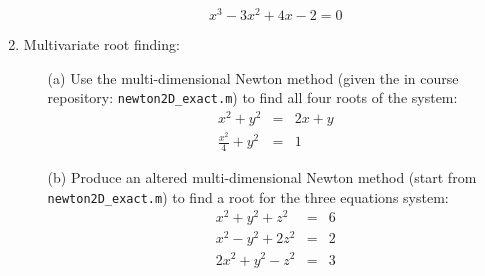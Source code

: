 \documentclass{article}
\begin{document}
\begin{enumerate}
\begin{itemize}
    \begin{equation}
      x^3-3x^2+4x-2=0
    \end{equation}  
  \end{itemize}
  \item Multivariate root finding:
  \begin{itemize}
    \item[(a)]  Use the multi-dimensional Newton method (given the in course repository:  \texttt{newton2D\_exact.m}) to find all four roots of the system:
    \begin{eqnarray}
      x^2+y^2&=&2x+y \\
      \frac{x^2}{4}+y^2&=&1      
    \end{eqnarray}
    \item[(b)]  Produce an altered multi-dimensional Newton method (start from \texttt{newton2D\_exact.m}) to find a root for the three equations system:
    \begin{eqnarray}
      x^2+y^2+z^2&=&6\\
      x^2-y^2+2z^2&=&2\\
      2x^2+y^2-z^2&=&3   
    \end{eqnarray}    
  \end{itemize}
\end{enumerate}
\end{document}
